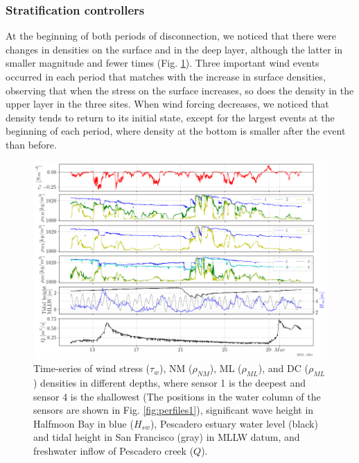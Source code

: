 \documentclass[tesis.tex]{subfiles}
\begin{document}
\subsubsection{Stratification controllers}

At the beginning of both periods of disconnection, we noticed that there were changes in densities on the surface and in the deep layer, although the latter in smaller magnitude and fewer times (Fig. \ref{fig:dens}). Three important wind events occurred in each period that matches with the increase in surface densities, observing that when the stress on the surface increases, so does the density in the upper layer in the three sites. When wind forcing decreases, we noticed that density tends to return to its initial state, except for the largest events at the beginning of each period, where density at the bottom is smaller after the event than before.\\

\begin{figure}[h!]
    \centering
    \includegraphics[width=\textwidth]{Imagenes/dens.png}
    \caption{Time-series of wind stress ($\tau_w$), NM ($\rho_{NM}$), ML ($\rho_{ML}$), and DC ($\rho_{ML}$) densities in different depths, where sensor 1 is the deepest and sensor 4 is the shallowest (The positions in the water column of the sensors are shown in Fig. \ref{fig:perfiles1}), significant wave height in Halfmoon Bay in blue ($H_{sw}$), Pescadero estuary water level (black) and tidal height in San Francisco (gray) in MLLW datum, and freshwater inflow of Pescadero creek ($Q$).}
    \label{fig:dens}
\end{figure}
\end{document}
